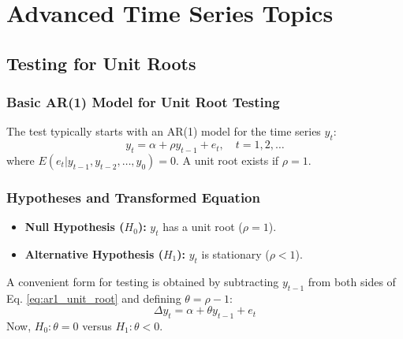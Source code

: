 \documentclass[a4paper, 10pt]{article}
\theoremstyle{definition}	%
\begin{document}
\newpage

\section{Advanced Time Series Topics}
\setcounter{equation}{0}
\setcounter{theorem}{0}
\setcounter{assumption}{0}

\subsection{Testing for Unit Roots}

\subsubsection{Basic AR(1) Model for Unit Root Testing}
The test typically starts with an AR(1) model for the time series \(y_t\):
\begin{equation} \label{eq:ar1_unit_root}
y_t = \alpha + \rho y_{t-1} + e_t, \quad t=1, 2, \dots
\end{equation}
where \(E(e_t | y_{t-1}, y_{t-2}, \dots, y_0) = 0\). A unit root exists if \(\rho=1\).

\subsubsection{Hypotheses and Transformed Equation}
\begin{itemize}
    \item \textbf{Null Hypothesis (\(H_0\)):} \(y_t\) has a unit root (\(\rho=1\)).
    \item \textbf{Alternative Hypothesis (\(H_1\)):} \(y_t\) is stationary (\(\rho < 1\)).
\end{itemize}
A convenient form for testing is obtained by subtracting \(y_{t-1}\) from both sides of Eq. \eqref{eq:ar1_unit_root} and defining \(\theta = \rho - 1\):
\begin{equation} \label{eq:df_regression_simple}
\Delta y_t = \alpha + \theta y_{t-1} + e_t
\end{equation}
Now, \(H_0: \theta=0\) versus \(H_1: \theta < 0\).
\end{document}
